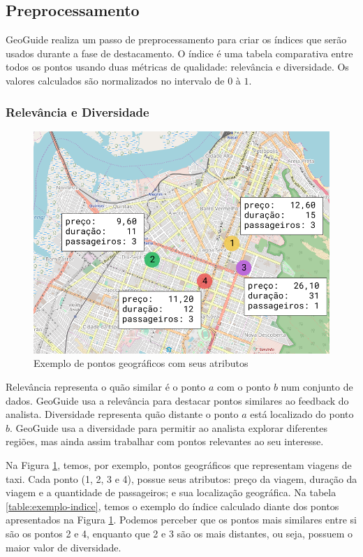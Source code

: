\subsection{Preprocessamento}

GeoGuide realiza um passo de preprocessamento para criar os índices que serão usados durante a fase de destacamento. O índice é uma tabela comparativa entre todos os pontos usando duas métricas de qualidade: relevância e diversidade. Os valores calculados são normalizados no intervalo de $0$ à $1$.

\subsubsection{Relevância e Diversidade}

\begin{figure}[t]
	\centering
	\includegraphics[width=\columnwidth]{imagens/exemplo-de-pontos}
	\caption{Exemplo de pontos geográficos com seus atributos}
	\label{fig:exemplo-pontos}
	\vspace{-10pt}
\end{figure}

Relevância representa o quão similar é o ponto $a$ com o ponto $b$ num conjunto de dados. GeoGuide usa a relevância para destacar pontos similares ao feedback do analista. Diversidade representa quão distante o ponto $a$ está localizado do ponto $b$. GeoGuide usa a diversidade para permitir ao analista explorar diferentes regiões, mas ainda assim trabalhar com pontos relevantes ao seu interesse.

Na Figura \ref{fig:exemplo-pontos}, temos, por exemplo, pontos geográficos que representam viagens de taxi. Cada ponto (1, 2, 3 e 4), possue seus atributos: preço da viagem, duração da viagem e a quantidade de passageiros; e sua localização geográfica. Na tabela \ref{table:exemplo-indice}, temos o exemplo do índice calculado diante dos pontos apresentados na Figura \ref{fig:exemplo-pontos}. Podemos perceber que os pontos mais similares entre si são os pontos 2 e 4, enquanto que 2 e 3 são os mais distantes, ou seja, possuem o maior valor de diversidade.

